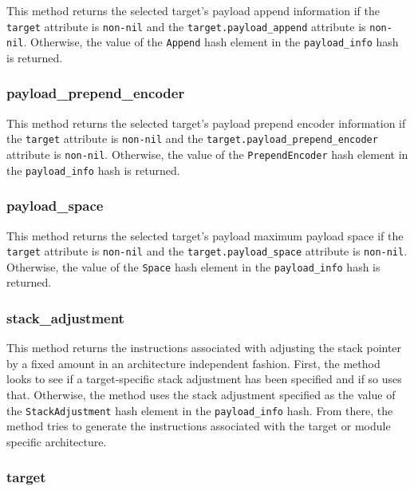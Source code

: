 \documentclass{report}
\begin{document}
\par
This method returns the selected target's payload append information
if the \texttt{target} attribute is \texttt{non-nil} and the
\texttt{target.payload\_append} attribute is \texttt{non-nil}.
Otherwise, the value of the \texttt{Append} hash element in the
\texttt{payload\_info} hash is returned.

            \subsubsection{payload\_prepend\_encoder}

\par
This method returns the selected target's payload prepend encoder
information if the \texttt{target} attribute is \texttt{non-nil} and
the \texttt{target.payload\_prepend\_encoder} attribute is
\texttt{non-nil}. Otherwise, the value of the
\texttt{PrependEncoder} hash element in the \texttt{payload\_info}
hash is returned.

            \subsubsection{payload\_space}

\par
This method returns the selected target's payload maximum payload
space if the \texttt{target} attribute is \texttt{non-nil} and the
\texttt{target.payload\_space} attribute is \texttt{non-nil}.
Otherwise, the value of the \texttt{Space} hash element in the
\texttt{payload\_info} hash is returned.

            \subsubsection{stack\_adjustment}

\par
This method returns the instructions associated with adjusting the
stack pointer by a fixed amount in an architecture independent
fashion.  First, the method looks to see if a target-specific stack
adjustment has been specified and if so uses that.  Otherwise, the
method uses the stack adjustment specified as the value of the
\texttt{StackAdjustment} hash element in the \texttt{payload\_info}
hash.  From there, the method tries to generate the instructions
associated with the target or module specific architecture.

            \subsubsection{target}
\end{document}
